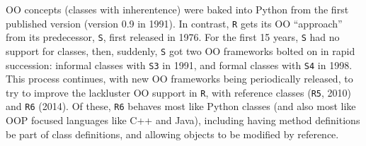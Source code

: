 \documentclass[
  12pt, krantz2,
]{book}
\newcommand{\passthrough}[1]{#1}
\theoremstyle{definition}
\theoremstyle{definition}
\theoremstyle{definition}
\newcommand{\1}{\mathbbm{1}}
\begin{document}
OO concepts (classes with inherentence) were baked into Python from the first
published version (version 0.9 in 1991). In contrast, \passthrough{\lstinline!R!} gets its OO ``approach''
from its predecessor, \passthrough{\lstinline!S!}, first released in 1976. For the first 15 years, \passthrough{\lstinline!S!}
had no support for classes, then, suddenly, \passthrough{\lstinline!S!} got two OO frameworks bolted on
in rapid succession: informal classes with \passthrough{\lstinline!S3!} in 1991, and formal classes with
\passthrough{\lstinline!S4!} in 1998. This process continues, with new OO frameworks being periodically
released, to try to improve the lackluster OO support in \passthrough{\lstinline!R!}, with reference
classes (\passthrough{\lstinline!R5!}, 2010) and \passthrough{\lstinline!R6!} (2014). Of these, \passthrough{\lstinline!R6!} behaves most like Python
classes (and also most like OOP focused languages like C++ and Java), including
having method definitions be part of class definitions, and allowing objects to
be modified by reference.

  

\backmatter
\printindex
\end{document}
